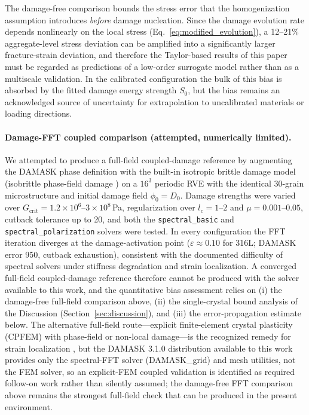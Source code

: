 \documentclass[twocolumn]{sagej}
\begin{document}
The damage-free comparison bounds the stress error that the homogenization assumption introduces \emph{before} damage nucleation. Since the damage evolution rate depends nonlinearly on the local stress (Eq.~\eqref{eq:modified_evolution}), a 12--21\% aggregate-level stress deviation can be amplified into a significantly larger fracture-strain deviation, and therefore the Taylor-based results of this paper must be regarded as predictions of a low-order surrogate model rather than as a multiscale validation. In the calibrated configuration the bulk of this bias is absorbed by the fitted damage energy strength $S_0$, but the bias remains an acknowledged source of uncertainty for extrapolation to uncalibrated materials or loading directions.

\paragraph{Damage-FFT coupled comparison (attempted, numerically limited).} We attempted to produce a full-field coupled-damage reference by augmenting the DAMASK phase definition with the built-in isotropic brittle damage model (isobrittle phase-field damage \cite{shanthraj2017phase}) on a $16^3$ periodic RVE with the identical 30-grain microstructure and initial damage field $\phi_0 = D_0$. Damage strengths were varied over $G_{\mathrm{crit}} = 1.2\times10^6$--$3\times10^8$\,Pa, regularization over $l_c = 1$--$2$ and $\mu = 0.001$--$0.05$, cutback tolerance up to 20, and both the \texttt{spectral\_basic} and \texttt{spectral\_polarization} solvers were tested. In every configuration the FFT iteration diverges at the damage-activation point ($\varepsilon \approx 0.10$ for 316L; DAMASK error 950, cutback exhaustion), consistent with the documented difficulty of spectral solvers under stiffness degradation and strain localization. A converged full-field coupled-damage reference therefore cannot be produced with the solver available to this work, and the quantitative bias assessment relies on (i) the damage-free full-field comparison above, (ii) the single-crystal bound analysis of the Discussion (Section~\ref{sec:discussion}), and (iii) the error-propagation estimate below. The alternative full-field route---explicit finite-element crystal plasticity (CPFEM) with phase-field or non-local damage---is the recognized remedy for strain localization \cite{liu2022phase,shanthraj2017phase}, but the DAMASK 3.1.0 distribution available to this work provides only the spectral-FFT solver (DAMASK\_grid) and mesh utilities, not the FEM solver, so an explicit-FEM coupled validation is identified as required follow-on work rather than silently assumed; the damage-free FFT comparison above remains the strongest full-field check that can be produced in the present environment.
\end{document}
